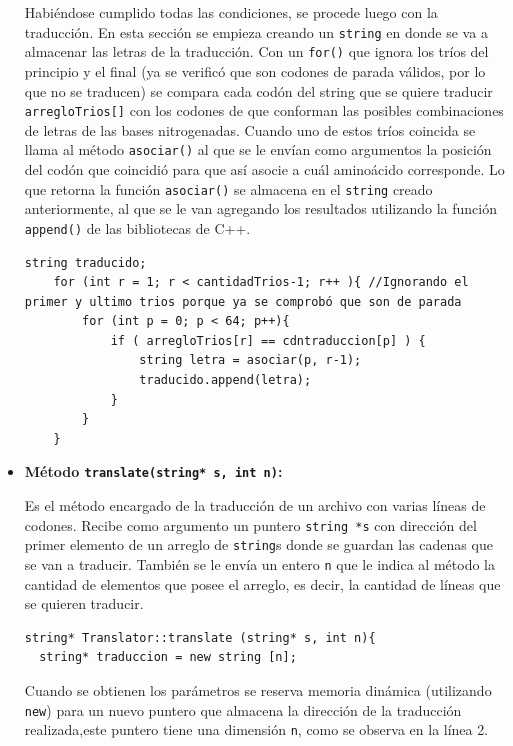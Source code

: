 \begin{itemize}
Habiéndose cumplido todas las condiciones, se procede luego con la traducción. En esta sección se empieza creando un \texttt{string} en donde se va a almacenar las letras de la traducción. Con un \texttt{for()} que ignora los tríos del principio y el final (ya se verificó que son codones de parada válidos, por lo que no se traducen) se compara cada codón del string que se quiere traducir \texttt{arregloTrios[]} con los codones de que conforman las posibles combinaciones de letras de las bases nitrogenadas. Cuando uno de estos tríos coincida se llama al método \texttt{asociar()} al que se le envían como argumentos la posición del codón que coincidió para que así asocie a cuál aminoácido corresponde. Lo que retorna la función \texttt{asociar()} se almacena en el \texttt{string} creado anteriormente, al que se le van agregando los resultados utilizando la función \texttt{append()} de las bibliotecas de C++.

\begin{verbatim}
string traducido;
  	for (int r = 1; r < cantidadTrios-1; r++ ){ //Ignorando el primer y ultimo trios porque ya se comprobó que son de parada
  		for (int p = 0; p < 64; p++){
  			if ( arregloTrios[r] == cdntraduccion[p] ) {
  				string letra = asociar(p, r-1);
  				traducido.append(letra);
  			}
  		}
  	}
\end{verbatim}


\item \textbf{Método \texttt{translate(string* s, int n)}:}

Es el método encargado de la traducción de un archivo con varias líneas de codones. Recibe como argumento un puntero \texttt{string *s} con dirección del primer elemento de un arreglo de \texttt{string}s donde se guardan las cadenas que se van a traducir. También se le envía un entero \texttt{n} que le indica al método la cantidad de elementos que posee el arreglo, es decir, la cantidad de líneas que se quieren traducir.

\begin{verbatim}
string* Translator::translate (string* s, int n){
  string* traduccion = new string [n];
\end{verbatim}
Cuando se obtienen los parámetros se reserva memoria dinámica (utilizando \texttt{new}) para un nuevo puntero que almacena la dirección de la traducción realizada,este puntero tiene una dimensión \texttt{n}, como se observa en la línea 2.


\end{itemize}
